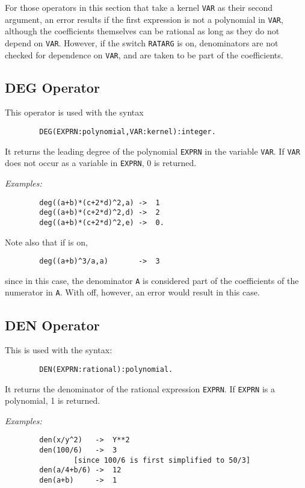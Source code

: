 For those operators in this section that take a kernel \texttt{VAR} as their
second argument, an error results if the first expression is not a
polynomial in \texttt{VAR}, although the coefficients themselves can be
rational as long as they do not depend on \texttt{VAR}.  However, if the
switch \texttt{RATARG} is on, denominators are not checked
for dependence on \texttt{VAR}, and are taken to be part of the coefficients.

\subsection{DEG Operator}
\hypertarget{operator:DEG}{}

This operator is used with the syntax
\begin{verbatim}
        DEG(EXPRN:polynomial,VAR:kernel):integer.
\end{verbatim}
It returns the leading degree of the polynomial \texttt{EXPRN}
in the variable \texttt{VAR}.  If \texttt{VAR} does not occur as a variable in
\texttt{EXPRN}, 0 is returned.

\textit{Examples:}
\begin{verbatim}
        deg((a+b)*(c+2*d)^2,a) ->  1
        deg((a+b)*(c+2*d)^2,d) ->  2
        deg((a+b)*(c+2*d)^2,e) ->  0.
\end{verbatim}
Note also that if  is on,
\begin{verbatim}
        deg((a+b)^3/a,a)       ->  3
\end{verbatim}
since in this case, the denominator \texttt{A} is considered part of the
coefficients of the numerator in \texttt{A}.  With  off, however,
an error would result in this case.

\subsection{DEN Operator}
\hypertarget{operator:DEN}{}

This is used with the syntax:
\begin{verbatim}
        DEN(EXPRN:rational):polynomial.
\end{verbatim}
It returns the denominator of the rational expression \texttt{EXPRN}.  If
\texttt{EXPRN} is a polynomial, 1 is returned.

\textit{Examples:}
\begin{verbatim}
        den(x/y^2)   ->  Y**2
        den(100/6)   ->  3
                [since 100/6 is first simplified to 50/3]
        den(a/4+b/6) ->  12
        den(a+b)     ->  1
\end{verbatim}

